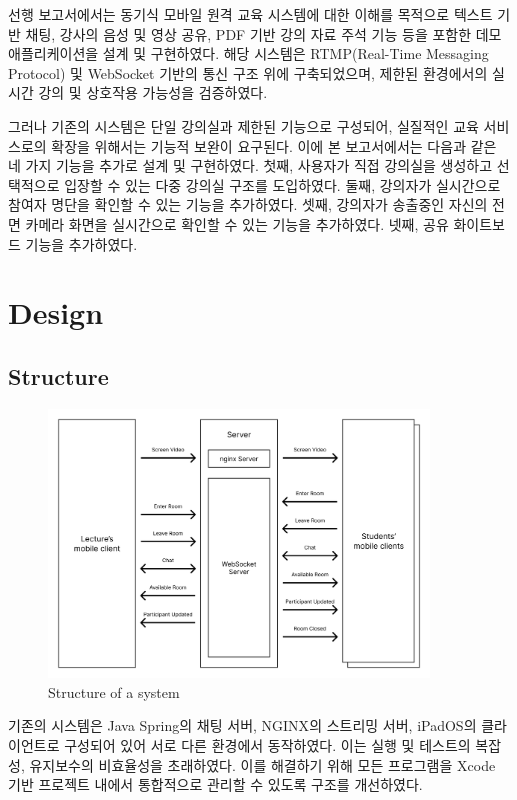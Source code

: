 \documentclass[pdflatex,sn-mathphys-num]{sn-jnl}%
\theoremstyle{thmstyleone}%
\theoremstyle{thmstyletwo}%
\theoremstyle{thmstylethree}%
\begin{document}
선행 보고서에서는 동기식 모바일 원격 교육 시스템에 대한 이해를 목적으로 텍스트 기반 채팅, 강사의 음성 및 영상 공유, PDF 기반 강의 자료 주석 기능 등을 포함한 데모 애플리케이션을 설계 및 구현하였다. 해당 시스템은 RTMP(Real-Time Messaging Protocol)\cite{RTMP} 및 WebSocket 기반의 통신 구조 위에 구축되었으며, 제한된 환경에서의 실시간 강의 및 상호작용 가능성을 검증하였다.

그러나 기존의 시스템은 단일 강의실과 제한된 기능으로 구성되어, 실질적인 교육 서비스로의 확장을 위해서는 기능적 보완이 요구된다. 이에 본 보고서에서는 다음과 같은 네 가지 기능을 추가로 설계 및 구현하였다. 첫째, 사용자가 직접 강의실을 생성하고 선택적으로 입장할 수 있는 다중 강의실 구조를 도입하였다. 둘째, 강의자가 실시간으로 참여자 명단을 확인할 수 있는 기능을 추가하였다. 셋째, 강의자가 송출중인 자신의 전면 카메라 화면을 실시간으로 확인할 수 있는 기능을 추가하였다. 넷째, 공유 화이트보드 기능을 추가하였다.

\section{Design}\label{sec2}

\subsection{Structure}\label{subsec1}

\begin{figure}[h]
\centering
\includegraphics[width=0.9\textwidth]{architecture_of_system.png}
\caption{Structure of a system}\label{fig1}
\end{figure}

기존의 시스템은 Java Spring\cite{Spring}의 채팅 서버, NGINX\cite{NGINX}의 스트리밍 서버, iPadOS의 클라이언트로 구성되어 있어 서로 다른 환경에서 동작하였다. 이는 실행 및 테스트의 복잡성, 유지보수의 비효율성을 초래하였다. 이를 해결하기 위해 모든 프로그램을 Xcode\cite{Xcode} 기반 프로젝트 내에서 통합적으로 관리할 수 있도록 구조를 개선하였다.
\end{document}
